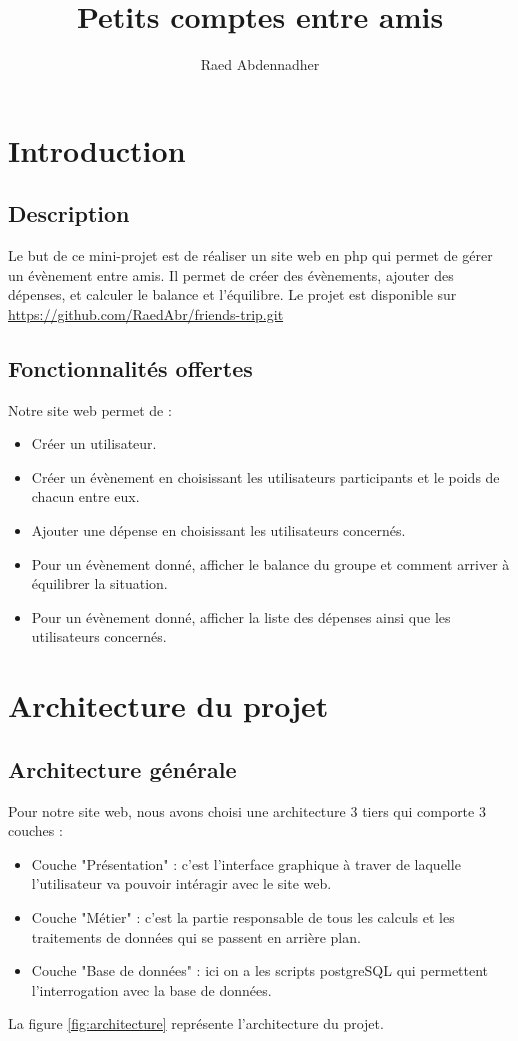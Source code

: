 \documentclass[a4paper, 11pt]{article}
\begin{document}
\title{Petits comptes entre amis} 
\author{Raed Abdennadher} 
\maketitle

\section{Introduction}
\subsection{Description}
Le but de ce mini-projet est de réaliser un site web en php qui permet de gérer un évènement entre amis. Il permet de créer des évènements, ajouter des dépenses, et calculer le balance et l'équilibre. Le projet est disponible sur \url{https://github.com/RaedAbr/friends-trip.git}

\subsection{Fonctionnalités offertes}
Notre site web permet de :
\begin{itemize}
	\item Créer un utilisateur.
	\item Créer un évènement en choisissant les utilisateurs participants et le poids de chacun entre eux.
	\item Ajouter une dépense en choisissant les utilisateurs concernés.
	\item Pour un évènement donné, afficher le balance du groupe et comment arriver à équilibrer la situation.
	\item Pour un évènement donné, afficher la liste des dépenses ainsi que les utilisateurs concernés.
\end{itemize}

\section{Architecture du projet}
\subsection{Architecture générale}
Pour notre site web, nous avons choisi une architecture 3 tiers qui comporte 3 couches : 
\begin{itemize}
	\item Couche "Présentation" : c'est l'interface graphique à traver de laquelle l'utilisateur va pouvoir intéragir avec le site web.
	\item Couche "Métier" : c'est la partie responsable de tous les calculs et les traitements de données qui se passent en arrière plan.
	\item Couche "Base de données" : ici on a les scripts postgreSQL qui permettent l'interrogation avec la base de données.
\end{itemize}
La figure \ref{fig:architecture} représente l'architecture du projet.
\end{document}
